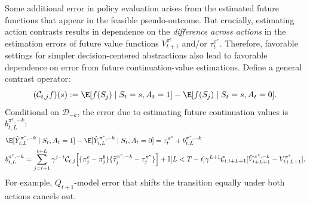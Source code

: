 \documentclass[opre,nonblindrev]{informs4}
\newenvironment{revision}{\begingroup\color{revisionblue}\ignorespaces}{\endgroup}
\providecommand{\cC}{\mathcal C}
\newcommand{\norm}[1]{\lVert#1\rVert}
\newcommand{\blipadv}{\tau}
\begin{document}
\begin{revision}
Some additional error in policy evaluation arises from the estimated future functions that appear in the feasible pseudo-outcome. But crucially, estimating action contrasts results in dependence on the \textit{difference across actions} in the estimation errors of future value functions $V_{t+1}^{\pi^e}$ and/or $\blipadv_t^{\pi^e}.$ Therefore, favorable settings for simpler decision-centered abstractions also lead to favorable dependence on error from future continuation-value estimations.  Define a general contrast operator: 
\begin{equation}
(\cC_{t,j}f)(s)
:=
\E[f(S_j)\mid S_t=s,A_t=1]-\E[f(S_j)\mid S_t=s,A_t=0].
\label{eq:diff-action-contrast-operator}
\end{equation}
Conditional on
$\mathcal{D}_{-k}$, the error due to estimating future continuation values is $b_{t,L}^{\pi^e,-k}:$
{\small
\begin{align}
&\E[ \hat Y_{t,L}^{\pi^e,-k}\mid S_t, A_t =1 ] - \E[ \hat Y_{t,L}^{\pi^e,-k}\mid S_t, A_t =0]=\blipadv_t^{\pi^e}+b_{t,L}^{\pi^e,-k}\notag\\
&
b_{t,L}^{\pi^e,-k}
=
\sum_{j=t+1}^{t+L}\gamma^{j-t}
\cC_{t,j}\!\left[
\{\pi_j^e-\pi_j^b\}
\{\widetilde\tau_j^{\pi^e,-k}-\blipadv_j^{\pi^e}\}
\right]
+
\mathbb I[L<T-t]\gamma^{L+1}
\cC_{t,t+L+1}[\hat V_{t+L+1}^{\pi^e,-k}-V_{t+L+1}^{\pi^e}].
\label{eq:diff-target-shift}
\end{align}
}
For example, $Q_{t+1}$-model error that shifts the transition
 equally under both actions cancels out. 



\end{revision}
\end{document}
